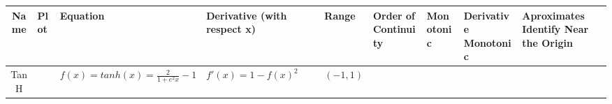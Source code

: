 \documentclass[]{book}
\begin{document}
\begin{longtable}[]{@{}cllllllll@{}}
\toprule
\begin{minipage}[b]{0.06\columnwidth}\centering\strut
Name\strut
\end{minipage} & \begin{minipage}[b]{0.01\columnwidth}\raggedright\strut
Plot\strut
\end{minipage} & \begin{minipage}[b]{0.27\columnwidth}\raggedright\strut
Equation\strut
\end{minipage} & \begin{minipage}[b]{0.19\columnwidth}\raggedright\strut
Derivative (with respect x)\strut
\end{minipage} & \begin{minipage}[b]{0.06\columnwidth}\raggedright\strut
Range\strut
\end{minipage} & \begin{minipage}[b]{0.05\columnwidth}\raggedright\strut
Order of Continuity\strut
\end{minipage} & \begin{minipage}[b]{0.03\columnwidth}\raggedright\strut
Monotonic\strut
\end{minipage} & \begin{minipage}[b]{0.04\columnwidth}\raggedright\strut
Derivative Monotonic\strut
\end{minipage} & \begin{minipage}[b]{0.05\columnwidth}\raggedright\strut
Aproximates Identify Near the Origin\strut
\end{minipage}\tabularnewline
\midrule
\endhead
\begin{minipage}[t]{0.06\columnwidth}\centering\strut
TanH\strut
\end{minipage} & \begin{minipage}[t]{0.01\columnwidth}\raggedright\strut
\strut
\end{minipage} & \begin{minipage}[t]{0.27\columnwidth}\raggedright\strut
\(f(x) = tanh(x) = \frac{2}{1+e^2x}-1\)\strut
\end{minipage} & \begin{minipage}[t]{0.19\columnwidth}\raggedright\strut
\(f'(x) = 1 - f(x)^2\)\strut
\end{minipage} & \begin{minipage}[t]{0.06\columnwidth}\raggedright\strut
\((-1,1)\)\strut
\end{minipage} & \begin{minipage}[t]{0.05\columnwidth}\raggedright\strut

\end{minipage}
\end{longtable}
\end{document}
